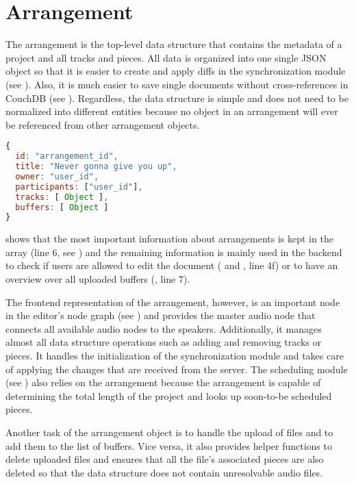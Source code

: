 \section{Arrangement}

The arrangement is the top-level data structure that contains the metadata of a project and all tracks and pieces. All data is organized into one single JSON object so that it is easier to create and apply diffs in the synchronization module (see ). Also, it is much easier to save single documents without cross-references in CouchDB (see ). Regardless, the data structure is simple and does not need to be normalized into different entities because no object in an arrangement will ever be referenced from other arrangement objects.

\begin{lstlisting}[language=JavaScript, caption=An arrangement's data structure, label=lst:arrangement-structure]
{
  id: "arrangement_id",
  title: "Never gonna give you up",
  owner: "user_id",
  participants: ["user_id"],
  tracks: [ Object ],
  buffers: [ Object ]
}
\end{lstlisting}

 shows that the most important information about arrangements is kept in the  array (line 6, see ) and the remaining information is mainly used in the backend to check if users are allowed to edit the document ( and , line 4f) or to have an overview over all uploaded buffers (, line 7).

The frontend representation of the arrangement, however, is an important node in the editor's node graph (see ) and provides the master audio node that connects all available audio nodes to the speakers. Additionally, it manages almost all data structure operations such as adding and removing tracks or pieces. It handles the initialization of the synchronization module and takes care of applying the changes that are received from the server. The scheduling module (see ) also relies on the arrangement because the arrangement is capable of determining the total length of the project and looks up soon-to-be scheduled pieces.

Another task of the arrangement object is to handle the upload of files and to add them to the list of buffers. Vice versa, it also provides helper functions to delete uploaded files and ensures that all the file's associated pieces are also deleted so that the data structure does not contain unresolvable audio files.